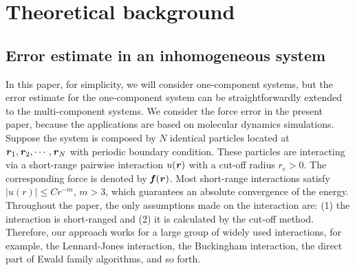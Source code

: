 \documentclass[aps, pre, preprint]{revtex4}
\renewcommand{\v}[1]{\textbf{\textit{#1}}}
\begin{document}



\section{Theoretical background}
\subsection{Error estimate in an inhomogeneous system}

In this paper, for simplicity,
we will consider one-component systems, but
the error estimate for
the one-component system can be straightforwardly extended to the
multi-component systems.  We consider
the force error in the present paper, because the
applications are based on molecular dynamics simulations.
Suppose the system is composed by $N$ identical particles located at
$\v r_1, \v r_2, \cdots, \v r_N$ with periodic boundary condition.
These particles are interacting via a short-range pairwise interaction
$u(\v r)$ with a cut-off radius $r_c > 0$.
The corresponding force is
denoted by $\v f(\v r)$. 
Most short-range interactions satisfy $\vert
u(r)\vert\leq C r^{-m}$, $m>3$, which guarantees an absolute convergence of the
energy.
Throughout the paper, the only assumptions made on the interaction are:
(1) the interaction is short-ranged and (2)
it is calculated by the cut-off method.
Therefore, our approach works for a large group of widely used interactions, 
for example, the Lennard-Jones interaction, the Buckingham interaction,
the direct part of Ewald family algorithms, and so forth.
\end{document}
